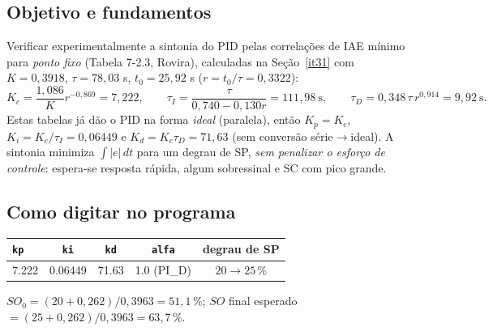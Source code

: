 \subsection{Objetivo e fundamentos}
Verificar experimentalmente a sintonia do PID pelas correlações de IAE mínimo para \emph{ponto fixo} (Tabela 7-2.3, Rovira), calculadas na Seção~\ref{it31} com $K=0{,}3918$, $\tau=78{,}03$ s, $t_0=25{,}92$ s ($r=t_0/\tau=0{,}3322$):
\[
K_c=\frac{1{,}086}{K}r^{-0{,}869}=7{,}222,\qquad\tau_I=\frac{\tau}{0{,}740-0{,}130r}=111{,}98\ \mathrm{s},\qquad\tau_D=0{,}348\,\tau\,r^{0{,}914}=9{,}92\ \mathrm{s}.
\]
Estas tabelas já dão o PID na forma \emph{ideal} (paralela), então $K_p=K_c$, $K_i=K_c/\tau_I=0{,}06449$ e $K_d=K_c\tau_D=71{,}63$ (sem conversão série$\to$ideal). A sintonia minimiza $\int|e|\,dt$ para um degrau de SP, \emph{sem penalizar o esforço de controle}: espera-se resposta rápida, algum sobressinal e SC com pico grande.
\subsection{Como digitar no programa}
\begin{center}\small\begin{tabular}{lcccc}\toprule \texttt{kp} & \texttt{ki} & \texttt{kd} & \texttt{alfa} & degrau de SP\\\midrule 7.222 & 0.06449 & 71.63 & 1.0 (PI\_D) & $20\to25\,\%$\\\bottomrule\end{tabular}\end{center}
$SO_0=(20+0{,}262)/0{,}3963=51{,}1\,\%$; $SO$ final esperado $=(25+0{,}262)/0{,}3963=63{,}7\,\%$.
